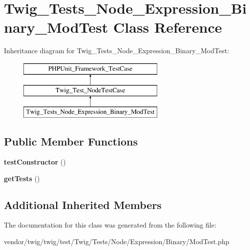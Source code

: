 \hypertarget{classTwig__Tests__Node__Expression__Binary__ModTest}{}\section{Twig\+\_\+\+Tests\+\_\+\+Node\+\_\+\+Expression\+\_\+\+Binary\+\_\+\+Mod\+Test Class Reference}
\label{classTwig__Tests__Node__Expression__Binary__ModTest}
Inheritance diagram for Twig\+\_\+\+Tests\+\_\+\+Node\+\_\+\+Expression\+\_\+\+Binary\+\_\+\+Mod\+Test\+:\begin{figure}[H]
\begin{center}
\leavevmode
\includegraphics[height=3.000000cm]{classTwig__Tests__Node__Expression__Binary__ModTest}
\end{center}
\end{figure}
\subsection*{Public Member Functions}
\begin{DoxyCompactItemize}
\item 
{\bfseries test\+Constructor} ()\hypertarget{classTwig__Tests__Node__Expression__Binary__ModTest_a45adfc1e0e328c6e1993e31025880ce5}{}\label{classTwig__Tests__Node__Expression__Binary__ModTest_a45adfc1e0e328c6e1993e31025880ce5}

\item 
{\bfseries get\+Tests} ()\hypertarget{classTwig__Tests__Node__Expression__Binary__ModTest_a2e6044b6ce915cbb892bd3aab00dfefa}{}\label{classTwig__Tests__Node__Expression__Binary__ModTest_a2e6044b6ce915cbb892bd3aab00dfefa}

\end{DoxyCompactItemize}
\subsection*{Additional Inherited Members}


The documentation for this class was generated from the following file\+:\begin{DoxyCompactItemize}
\item 
vendor/twig/twig/test/\+Twig/\+Tests/\+Node/\+Expression/\+Binary/Mod\+Test.\+php\end{DoxyCompactItemize}
